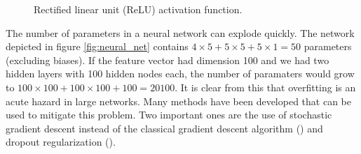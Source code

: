 \begin{figure}[!ht]
\centering
{}
\caption{Rectified linear unit (ReLU) activation function.}\label{fig:relu_function}
\end{figure}

The number of parameters in a neural network can explode quickly. The network depicted
in figure \ref{fig:neural_net} contains $4 \times 5 + 5 \times 5 + 5 \times 1 = 50$
parameters (excluding biases). If the feature vector had dimension 100 and we had two
hidden layers with 100 hidden nodes each, the number of paramaters would grow to $100
\times 100 + 100 \times 100 + 100 = 20100$. It is clear from this that overfitting is an
acute hazard in large networks. Many methods have been developed that can be used to
mitigate this problem. Two important ones are the use of stochastic gradient descent
instead of the classical gradient descent algorithm (\cite{Ruppert.1985}) and dropout
regularization (\cite{Srivastava.2014}).
